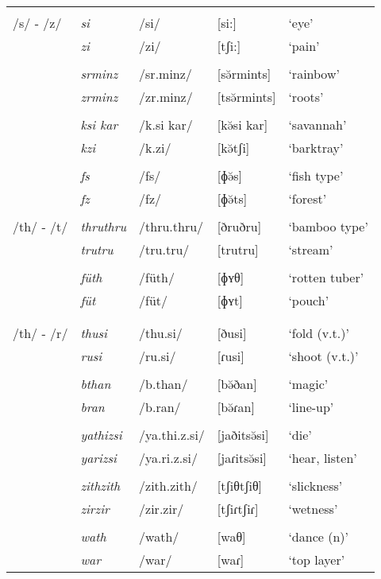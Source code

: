 \begin{table}
\begin{tabularx}{\textwidth}{lllll}
		&&&&\\
		/s/ - /z/ & \emph{si} & /si/ & [si:] & `eye'\\
		& \emph{zi} & /zi/ & [tʃi:] & `pain'\\
		&&&&\\
		& \emph{srminz} & /sr.minz/ & [sə̆rmints] & `rainbow'\\
		& \emph{zrminz} & /zr.minz/ & [tsə̆rmints] & `roots'\\
		&&&&\\
		& \emph{ksi kar} & /k.si kar/ & [kə̆si kar] & `savannah'\\
		& \emph{kzi} & /k.zi/ & [kə̆tʃi] & `barktray'\\
		&&&&\\
		& \emph{fs} & /fs/ & [ɸə̆s] & `fish type'\\
		& \emph{fz} & /fz/ & [ɸə̆ts] & `forest'\\
		&&&&\\
		/th/ - /t/ & \emph{thruthru} & /thru.thru/ & [ðruðru] & `bamboo type'\\
		& \emph{trutru} & /tru.tru/ & [trutru] & `stream'\\
		&&&&\\
		& \emph{füth} & /füth/ & [ɸʏθ] & `rotten tuber'\\
		& \emph{füt} & /füt/ & [ɸʏt] & `pouch'\\
		&&&&\\
		&&&&\\
		/th/ - /r/ & \emph{thusi} & /thu.si/ & [ðusi] & `fold (v.t.)'\\
		& \emph{rusi} & /ru.si/ & [ɾusi] & `shoot (v.t.)'\\
		&&&&\\
		& \emph{bthan} & /b.than/ & [\super{m}bə̆ðan] & `magic'\\
		& \emph{bran} & /b.ran/ & [\super{m}bə̆ɾan] & `line-up'\\
		&&&&\\
		& \emph{yathizsi} & /ya.thi.z.si/ & [jaðitsə̆si] & `die'\\
		& \emph{yarizsi} & /ya.ri.z.si/ & [jaɾitsə̆si] & `hear, listen'\\
		&&&&\\
		& \emph{zithzith} & /zith.zith/ & [tʃiθtʃiθ]& `slickness'\\
		& \emph{zirzir} & /zir.zir/ & [tʃiɾtʃiɾ]& `wetness'\\
		&&&&\\
		& \emph{wath} & /wath/ & [waθ] & `dance (n)'\\
		& \emph{war} & /war/ & [waɾ] & `top layer'\\

\end{tabularx}
\end{table}
